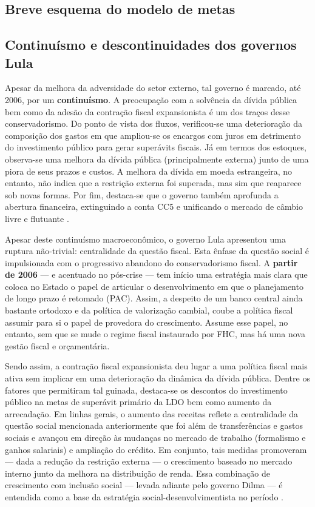 \documentclass[11pt]{article}
\begin{document}
\subsection*{Breve esquema do modelo de metas}
\label{sec:orgdabf650}

\subsection*{Continuísmo e descontinuidades dos governos Lula}
\label{sec:org7a146ca}

Apesar da melhora da adversidade do setor externo, tal governo é marcado, até 2006, por um \textbf{continuísmo}. 
A preocupação com a solvência da dívida pública bem como da adesão da contração fiscal expansionista é um dos traços desse conservadorismo. 
Do ponto de vista dos fluxos, verificou-se uma deterioração da composição dos gastos em que ampliou-se os encargos com juros em detrimento do investimento público para gerar superávits fiscais.
Já em termos dos estoques, observa-se uma melhora da dívida pública (principalmente externa) junto de uma piora de seus prazos e custos.
A melhora da dívida em moeda estrangeira, no entanto, não indica que a restrição externa foi superada, mas sim que reaparece sob novas formas.
Por fim, destaca-se que o governo também aprofunda a abertura financeira, extinguindo a conta CC5 e unificando o mercado de câmbio livre e flutuante \cite{pratesSECAOIVInsercao}.

Apesar deste continuísmo macroeconômico, o governo Lula apresentou uma ruptura não-trivial: centralidade da questão fiscal.
Esta ênfase da questão social é impulsionada com o progressivo abandono do conservadorismo fiscal.
A \textbf{partir de 2006} ---  e acentuado no pós-crise --- tem início uma estratégia mais clara que coloca no Estado o papel de
articular o desenvolvimento em que o planejamento de longo prazo é retomado (PAC). 
Assim, a despeito de um banco central ainda bastante ortodoxo e da política de valorização cambial, coube a política fiscal assumir para si o papel de provedora do crescimento. 
Assume esse papel, no entanto, sem que se mude o regime fiscal instaurado por FHC, mas há uma nova gestão fiscal e orçamentária.

Sendo assim, a contração fiscal expansionista deu lugar a uma política fiscal mais ativa sem implicar em uma deterioração da dinâmica da dívida pública. 
Dentre os fatores que permitiram tal guinada, destaca-se os descontos do investimento público na metas de superávit primário da LDO bem como aumento da arrecadação.
Em linhas gerais, o aumento das receitas reflete a centralidade da questão social mencionada anteriormente que foi além de transferências e gastos sociais e avançou em direção às mudanças no mercado de trabalho (formalismo e ganhos salariais) e ampliação do crédito.
Em conjunto, tais medidas promoveram --- dada a redução da restrição externa --- o crescimento baseado no mercado interno junto da melhora na distribuição de renda.
Essa combinação de crescimento com inclusão social --- levada adiante pelo governo Dilma --- é entendida como a base da estratégia social-desenvolvimentista no período \cite{biancarelliVelhaSenhoraEm2019}. 
\end{document}
